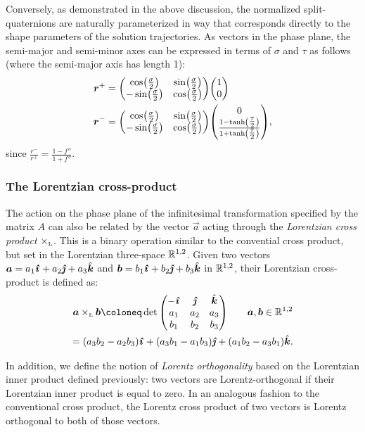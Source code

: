 Conversely, as demonstrated in the above discussion, the normalized split-quaternions are naturally parameterized in way that corresponds directly to the shape parameters of the solution trajectories. As vectors in the phase plane, the semi-major and semi-minor axes can be expressed in terms of $\sigma$ and $\tau$ as follows (where the semi-major axis has length 1):
\begin{equation}
    \begin{split}
        \vec{r}^+ &= \mqty(\cos(\tfrac{\sigma}{2}) & \sin(\tfrac{\sigma}{2}) \\ -\sin(\tfrac{\sigma}{2}) & \cos(\tfrac{\sigma}{2}))\mqty(1 \\ 0 ) \\
        \vec{r}^- &= \mqty(\cos(\tfrac{\sigma}{2}) & \sin(\tfrac{\sigma}{2}) \\ -\sin(\tfrac{\sigma}{2}) & \cos(\tfrac{\sigma}{2}))\mqty( 0 \\ \frac{1 - \tanh(\tfrac{\tau}{2})}{1 + \tanh(\tfrac{\tau}{2})}), \\
    \end{split}
    \label{eq:major_axes}
\end{equation}
since $\displaystyle \frac{r^-}{r^+} = \frac{1 - f''}{1 + f''}$.

\subsubsection{The Lorentzian cross-product}
The action on the phase plane of the infinitesimal transformation specified by the matrix $A$ can also be related by the vector $\vec{a}$ acting through the \emph{Lorentzian cross product} $\times_\text{\tiny{L}} $. This is a binary operation similar to the convential cross product, but set in the Lorentzian three-space $\mathbb{R}^{1, 2}$. Given two vectors $\vec{a} = a_1\quati + a_2\quatj + a_3\quatk$ and $\vec{b} = b_1\quati + b_2\quatj + b_3\quatk$ in $\mathbb{R}^{1, 2}$, their Lorentzian cross-product is defined as: \cite{Jafari2014}
\begin{gather}
        \lorcrossp{\vec{a}}{\vec{b}} \coloneq \det\mqty(-\quati & \quatj & \quatk \\ a_1 & a_2 & a_3 \\ b_1 & b_2 & b_3) \qquad \vec{a}, \vec{b} \in \real^{1, 2} \\
            = \qty(a_3b_2 - a_2b_3)\quati + \qty(a_3b_1 - a_1b_3)\quatj + \qty(a_1b_2 - a_3b_1)\quatk.
\end{gather}

In addition, we define the notion of \emph{Lorentz orthogonality} based on the Lorentzian inner product defined previously: two vectors are Lorentz-orthogonal if their Lorentzian inner product is equal to zero. In an analogous fashion to the conventional cross product, the Lorentz cross product of two vectors is Lorentz orthogonal to both of those vectors.


